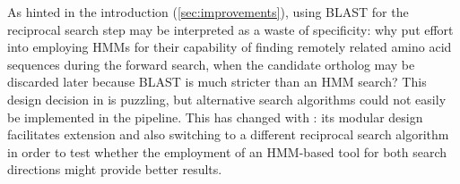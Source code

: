 As hinted in the introduction (\autoref{sec:improvements}), using BLAST for the
reciprocal search step may be interpreted as a waste of specificity: why put
effort into employing HMMs for their capability of finding remotely related
amino acid sequences during the forward search, when the candidate ortholog may
be discarded later because BLAST is much stricter than an HMM search? This design
decision in \hamstr is puzzling, but alternative search algorithms could not
easily be implemented in the pipeline. This has changed with \pname: its modular
design facilitates extension and also switching to a different reciprocal search
algorithm in order to test whether the employment of an HMM-based tool for both
search directions might provide better results.
